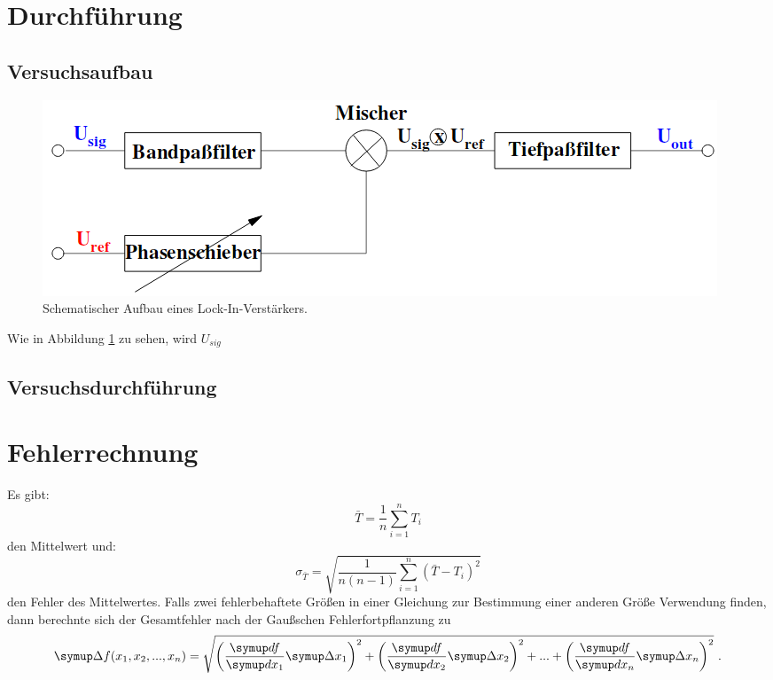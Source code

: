 \section{Durchführung}
\subsection{Versuchsaufbau}
\label{sec:3.1}
\begin{figure}
  \centering
  \includegraphics[scale=0.5]{aufbau.png}
  \caption{Schematischer Aufbau eines Lock-In-Verstärkers.}
  \label{fig:2}
\end{figure}
Wie in Abbildung \ref{fig:2} zu sehen, wird $U_{sig}$ 

\subsection{Versuchsdurchführung}

\section{Fehlerrechnung}
Es gibt:
\begin{equation}
  \bar{T} = \frac{1}{n} \sum_{i=1}^{n} T_{i}
  \label{eqn:1}
\end{equation}
den Mittelwert und:
\begin{equation}
  \sigma_{\bar{T}} = \sqrt{\frac{1}{n(n-1)} \sum_{i=1}^{n}(\bar{T}-T_i)^2}
  \label{eqn:2}
\end{equation}
den Fehler des Mittelwertes. Falls zwei fehlerbehaftete Größen in einer Gleichung
zur Bestimmung einer anderen Größe Verwendung finden, dann berechnte sich der Gesamtfehler
nach der Gaußschen Fehlerfortpflanzung zu
\begin{equation}
    \symup \Delta f(x_1, x_2, ..., x_n) = \sqrt{\left(\frac{\symup df}{\symup dx_1} \symup \Delta
    x_1 \right)^2 +    \left(\frac{\symup df}{\symup dx_2} \symup \Delta
    x_2 \right)^2 + ... + \left(\frac{\symup df}{\symup dx_n} \symup \Delta x_n \right)^2} \ .
    \label{eqn:3}
\end{equation}

